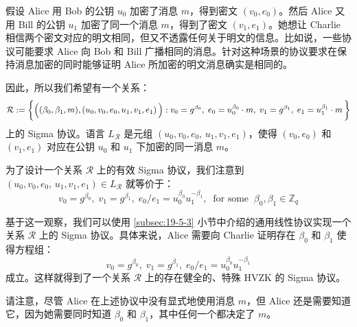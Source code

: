 \begin{example}[明文相等]
假设 Alice 用 Bob 的公钥 $u_0$ 加密了消息 $m$，得到密文 $(v_0,e_0)$。然后 Alice 又用 Bill 的公钥 $u_1$ 加密了同一个消息 $m$，得到了密文 $(v_1,e_1)$。她想让 Charlie 相信两个密文对应的明文相同，但又不透露任何关于明文的信息。比如说，一些协议可能要求 Alice 向 Bob 和 Bill 广播相同的消息。针对这种场景的协议要求在保持消息加密的同时能够证明 Alice 所加密的明文消息确实是相同的。

因此，所以我们希望有一个关系：
\[
\mathcal{R}:=
\bigg\lbrace
\Big(
(\beta_0,\beta_1,m), (u_0,v_0,e_0,u_1,v_1,e_1)
\,\Big) :\\
v_0=g^{\beta_0},\;
e_0=u_0^{\beta_0}\cdot m,\;
v_1=g^{\beta_1},\;
e_1=u_1^{\beta_1}\cdot m\,
\bigg\rbrace
\]
上的 Sigma 协议。语言 $L_\mathcal{R}$ 是元组 $(u_0,v_0,e_0,\,u_1,v_1,e_1)$，使得 $(v_0,e_0)$ 和 $(v_1,e_1)$ 对应在公钥 $u_0$ 和 $u_1$ 下加密的同一消息 $m$。

为了设计一个关系 $\mathcal{R}$ 上的有效 Sigma 协议，我们注意到 $(u_0,v_0,e_0,\,u_1,v_1,e_1)\in L_\mathcal{R}$ 就等价于：
\[
v_0=g^{\beta_0},\;
v_1=g^{\beta_1},\;
{e_0}/{e_1}=u_0^{\beta_0}u_1^{-\beta_1},\ 
\text{ for some }\ \beta_0,\beta_1\in\mathbb{Z}_q
\]

基于这一观察，我们可以使用 \ref{subsec:19-5-3} 小节中介绍的通用线性协议实现一个关系 $\mathcal{R}$ 上的 Sigma 协议。具体来说，Alice 需要向 Charlie 证明存在 $\beta_0$ 和 $\beta_1$ 使得方程组：
\[
v_0 =g^{β_0},\;
v_1=g^{\beta_1},\;
{e_0}/{e_1}=u_0^{\beta_0}u_1^{-\beta_1}
\]
成立。这样就得到了一个关系 $\mathcal{R}$ 上的存在健全的、特殊 HVZK 的 Sigma 协议。

请注意，尽管 Alice 在上述协议中没有显式地使用消息 $m$，但 Alice 还是需要知道它，因为她需要同时知道 $\beta_0$ 和 $\beta_1$，其中任何一个都决定了 $m$。
\end{example}

